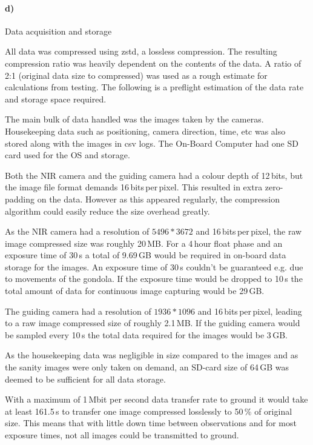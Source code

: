 \paragraph{d)} Data acquisition and storage

All data was compressed using zstd, a lossless compression. The resulting compression ratio was heavily dependent on the contents of the data. A ratio of 2:1 (original data size to compressed) was used as a rough estimate for calculations from testing. The following is a preflight estimation of the data rate and storage space required.

The main bulk of data handled was the images taken by the cameras. Housekeeping data such as positioning, camera direction, time, etc was also stored along with the images in csv logs. The On-Board Computer had one SD card used for the OS and storage. 

Both the NIR camera and the guiding camera had a colour depth of 12\,bits, but the image file format demands 16\,bits\,per\,pixel. This resulted in extra zero-padding on the data. However as this appeared regularly, the compression algorithm could easily reduce the size overhead greatly.

As the NIR camera had a resolution of $5496 * 3672$ and 16\,bits\,per\,pixel, the raw image compressed size was roughly 20\,MB. For a 4\,hour float phase and an exposure time of 30\,s a total of  9.69\,GB would be required in on-board data storage for the images. An exposure time of 30\,s couldn't be guaranteed e.g. due to movements of the gondola. If the exposure time would be dropped to 10\,s the total amount of data for continuous image capturing would be 29\,GB.

The guiding camera had a resolution of $1936 * 1096$ and 16\,bits\,per\,pixel, leading to a raw image compressed size of roughly 2.1\,MB. If the guiding camera would be sampled every 10\,s the total data required for the images would be 3\,GB.

As the housekeeping data was negligible in size compared to the images and as the sanity images were only taken on demand, an SD-card size of 64\,GB was deemed to be sufficient for all data storage.

With a maximum of 1\,Mbit per second data transfer rate to ground it would take at least 161.5\,s to transfer one image compressed losslessly to 50\,\% of original size. This means that with little down time between observations and for most exposure times, not all images could be transmitted to ground.

